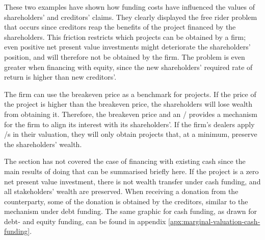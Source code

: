 \documentclass[main.tex]{subfiles}
\begin{document}
    These two examples have shown how funding costs have influenced 
    the values of shareholders' and creditors' claims.
    They clearly displayed the free rider problem that occurs
    since creditors reap the benefits of the project financed by the shareholders.
    This friction restricts which projects can be obtained by a firm;
    even positive net present value investments might deteriorate the shareholders' position,
    and will therefore not be obtained by the firm.
    The problem is even greater when financing with equity, 
    since the new shareholders' required rate of return is higher than new creditors'.
   
    The firm can use the breakeven price as a benchmark for projects. 
    If the price of the project is higher than the breakeven price, 
    the shareholders will lose wealth from obtaining it.
    Therefore, the breakeven price and an \FVA/ provides a mechanism for the firm
    to align its interest with its shareholders'.
    If the firm's dealers apply \FVA/s in their valuation,
    they will only obtain projects that, at a minimum, preserve the shareholders' wealth.
    
    The section has not covered the case of financing with existing cash
    since the main results of doing that can be summarised briefly here.
    If the project is a zero net present value investment, 
    there is not wealth transfer under cash funding,
    and all stakeholders' wealth are preserved.
    When receiving a donation from the counterparty, 
    some of the donation is obtained by the creditors, similar to the mechanism under debt funding.
    The same graphic for cash funding, as drawn for debt- and equity funding, can be found in appendix
    \ref{apx:marginal-valuation-cash-funding}.
\end{document}
